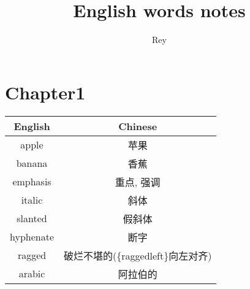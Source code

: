 \documentclass[11pt]{article}
\title{English words notes}
\author{Rey}
\begin{document}
\maketitle

\tableofcontents


\section{Chapter1}
\begin{table}[htpb]
  \centering
     \begin{tabular}{|c|c|}
       \hline
       English&{Chinese}   \\ \hline
       apple&苹果 \\ \hline
       banana&香蕉 \\ \hline
       emphasis&重点, 强调 \\ \hline
       italic&斜体 \\ \hline
       slanted&假斜体 \\ \hline
       hyphenate&断字 \\ \hline
       ragged&破烂不堪的(\{raggedleft\}向左对齐) \\ \hline
       arabic&阿拉伯的\\ \hline

     \end{tabular}
\end{table}
\end{document}
